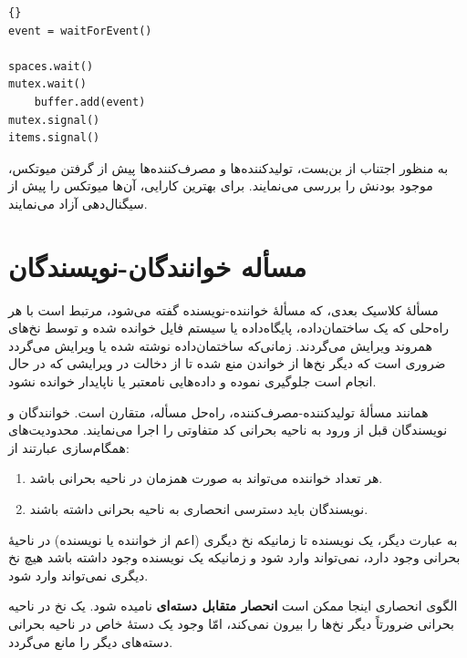 \documentclass{book}
\begin{document}
\begin{latin}
\begin{lstlisting}[title=\rl{راه‌حل  بافر محدود تولیدکننده}]{}
event = waitForEvent()

spaces.wait()
mutex.wait()
    buffer.add(event)
mutex.signal()
items.signal()
\end{lstlisting}
\end{latin}

    به منظور اجتناب از بن‌بست، تولیدکننده‌ها و مصرف‌کننده‌ها پیش از گرفتن میوتکس، موجود بودنش را بررسی می‌نمایند. 
    برای بهترین کارایی، آن‌ها میوتکس را پیش از سیگنال‌دهی آزاد می‌نمایند. 


\section{مسأله خوانندگان-نویسندگان}

    مسألهٔ کلاسیک بعدی، که مسألهٔ خواننده-نویسنده گفته می‌شود، مرتبط است با هر راه‌حلی که یک ساختمان‌داده، پایگاه‌داده یا سیستم فایل 
    خوانده شده و توسط نخ‌های همروند ویرایش می‌گردند. زمانی‌که ساختمان‌داده نوشته شده یا ویرایش می‌گردد ضروری است که دیگر نخ‌ها
    از خواندن منع شده تا از دخالت در ویرایشی که در حال انجام است جلوگیری نموده و داده‌هایی نامعتبر یا ناپایدار خوانده نشود. 

    همانند مسألهٔ تولیدکننده‌-مصرف‌کننده،‌ راه‌حل مسأله، متقارن است. 
    خوانندگان و نویسندگان قبل از ورود به ناحیه بحرانی کد متفاوتی را اجرا می‌نمایند. محدودیت‌های همگام‌سازی عبارتند از: 

\begin{enumerate}

\item 
    هر تعداد خواننده می‌تواند به صورت همزمان در ناحیه بحرانی باشد. 

\item 
    نویسندگان باید دسترسی انحصاری به ناحیه بحرانی داشته باشند. 
\end{enumerate}

    به عبارت دیگر، یک نویسنده تا زمانیکه نخ دیگری (اعم از خواننده یا نویسنده) در ناحیهٔ بحرانی وجود دارد، نمی‌تواند وارد شود و زمانیکه یک نویسنده 
    وجود داشته باشد هیچ نخ دیگری نمی‌تواند وارد شود. 

    الگوی انحصاری اینجا ممکن است \textbf{انحصار متقابل دسته‌ای} نامیده شود. 
    یک نخ در ناحیه بحرانی ضرورتاً دیگر نخ‌ها را بیرون نمی‌کند، امّا وجود یک دستهٔ خاص در ناحیه بحرانی دسته‌های دیگر را مانع می‌گردد. 
\end{document}
